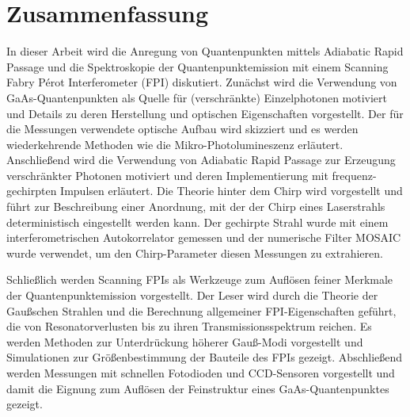 
\chapter*{Zusammenfassung}
\label{cha:zusammenfassung}


In dieser Arbeit wird die Anregung von Quantenpunkten mittels Adiabatic Rapid Passage und die Spektroskopie der Quantenpunktemission mit einem Scanning Fabry Pérot Interferometer (FPI) diskutiert.
Zunächst wird die Verwendung von GaAs-Quantenpunkten als Quelle für (verschränkte) Einzelphotonen motiviert und Details zu deren Herstellung und optischen Eigenschaften vorgestellt.
Der für die Messungen verwendete optische Aufbau wird skizziert und es werden wiederkehrende Methoden wie die Mikro-Photolumineszenz erläutert.
Anschließend wird die Verwendung von Adiabatic Rapid Passage zur Erzeugung verschränkter Photonen motiviert und deren Implementierung mit frequenz-gechirpten Impulsen erläutert.
Die Theorie hinter dem Chirp wird vorgestellt und führt zur Beschreibung einer Anordnung, mit der der Chirp eines Laserstrahls deterministisch eingestellt werden kann.
Der gechirpte Strahl wurde mit einem interferometrischen Autokorrelator gemessen und der numerische Filter MOSAIC wurde verwendet, um den Chirp-Parameter diesen Messungen zu extrahieren.

Schließlich werden Scanning FPIs als Werkzeuge zum Auflösen feiner Merkmale der Quantenpunktemission vorgestellt.
Der Leser wird durch die Theorie der Gaußschen Strahlen und die Berechnung allgemeiner FPI-Eigenschaften geführt, die von Resonatorverlusten bis zu ihren Transmissionsspektrum reichen.
Es werden Methoden zur Unterdrückung höherer Gauß-Modi vorgestellt und Simulationen zur Größenbestimmung der Bauteile des FPIs gezeigt.
Abschließend werden Messungen mit schnellen Fotodioden und CCD-Sensoren vorgestellt und damit die Eignung zum Auflösen der Feinstruktur eines GaAs-Quantenpunktes gezeigt.

